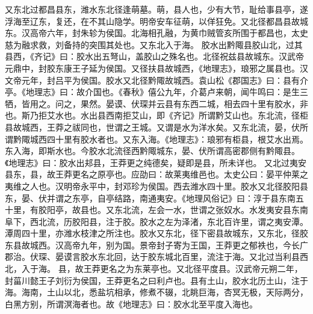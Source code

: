 \documentclass[12pt,UTF8]{ctexbook}
\begin{document}
又东北过都昌县东，潍水东北径逢萌墓。萌，县人也，少有大节，耻给事县亭，遂浮海至辽东，复还，在不其山隐学。明帝安车征萌，以佯狂免。又北径都昌县故城东。汉高帝六年，封朱轸为侯国。北海相孔融，为黄巾贼管亥所围于都昌也，太史慈为融求救，刘备持的突围其处也。又东北入于海。
胶水出黔陬县胶山北，过其县西，《齐记》曰：胶水出五弩山，盖胶山之殊名也。北径祝兹县故城东。汉武帝元鼎中，封胶东康王子延为侯国。又径扶县故城西，《地理志》，琅邪之属县也。汉文帝元年，封吕平为侯国。胶水又北径黔陬故城西。袁山松《郡国志》曰：县有介亭。《地理志》曰：故介国也。《春秋》僖公九年，介葛卢来朝，闻牛鸣曰：是生三牺，皆用之。问之，果然。晏谟、伏琛并云县有东西二城，相去四十里有胶水，非也。斯乃拒艾水也。水出县西南拒艾山，即《齐记》所谓黔艾山也。东北流，径柜县故城西，王莽之祓同也，世谓之王城。又谓是水为洋水矣。又东北流，晏，伏所谓黔陬城西四十里有胶水者也。又东入海。《地理志》：琅邪有柜县，根艾水出焉。东入海，即斯水也。今胶水北流径西黔陬城东，晏、伏所谓高密郡侧有黔陬县。《地理志》曰：胶水出邞县，王莽更之纯德矣，疑即是县，所未详也。
又北过夷安县东，县，故王莽更名之原亭也。应劭曰：故莱夷维邑也。太史公曰：晏平仲莱之夷维之人也。汉明帝永平中，封邓珍为侯国。西去潍水四十里。胶水又北径胶阳县东，晏、伏并谓之东亭，自亭结路，南通夷安。《地理风俗记》曰：淳于县东南五十里，有胶阳亭，故县也。又东北流，左会一水，世谓之张奴水。水发夷安县东南阜下，西北流，历胶阳县，注于胶。胶水之左为泽渚，东北百许里，谓之夷安潭。潭周四十里，亦潍水枝津之所注也。胶水又东北，径下密县故城东，又东北，径胶东县故城西。汉高帝九年，别为国。景帝封子寄为王国，王莽更之郁袟也，今长广郡治。伏琛、晏谟言胶水东北回，达于胶东城北百里，流注于海。又北过当利县西北，入于海。
县，故王莽更名之为东莱亭也。又北径平度县。汉武帝元朔二年，封菑川懿王子刘衍为侯国，王莽更名之曰利卢也。县有土山，胶水北历土山，注于海。海南，土山以北，悉盐坑相承，修煮不辍，北眺巨海，杏冥无极，天际两分，白黑方别，所谓溟海者也。故《地理志》曰：胶水北至平度入海也。
\end{document}

